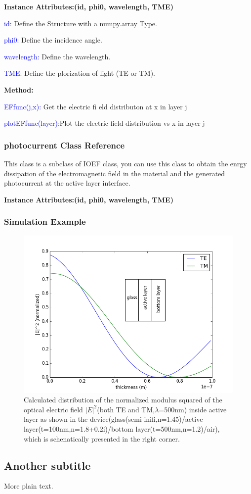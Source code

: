 \documentclass{article}
\begin{document}
\textbf{Instance Attributes:(id, phi0, wavelength, TME)}

\textcolor{blue}{id:} Define the Structure with a numpy.array Type.

\textcolor{blue}{phi0:} Define the incidence angle.

\textcolor{blue}{wavelength:} Define the wavelength.

\textcolor{blue}{TME:} Define the plorization of light (TE or TM).

\textbf{Method:}

\textcolor{blue}{EFfunc(j,x):} Get the electric fi eld distributon at x in layer
j

\textcolor{blue}{plotEFfunc(layer):}Plot the electric field distribution vs x in
layer j
\subsubsection{photocurrent Class Reference}
This class is a subclass of IOEF class, you can use this class to obtain the
enrgy dissipation of the electromagnetic field in the material and the
generated photocurrent at the active layer interface.

\textbf{Instance Attributes:(id, phi0, wavelength, TME)}

\subsubsection{Simulation Example}
\begin{figure}[h!]
  \centering
    \includegraphics[width=1\textwidth]{electricfield}
  \caption{Calculated distribution of the normalized modulus squared of the
  optical electric field ${{\left| E \right|}^{2}}$(both TE and
  TM,$\lambda$=500nm) inside active layer as shown in the
  device(glass(semi-inifi,n=1.45)/active layer(t=100nm,n=1.8+0.2i)/bottom
  layer(t=500nm,n=1.2)/air), which is schenatically presented in the right
  corner.
  }
  \label{electricfield}
\end{figure}







\subsection{Another subtitle}
More plain text.

{}

\end{document}
